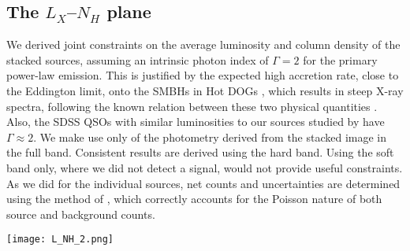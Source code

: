 \documentclass[useAMS,usenatbib]{mnras}
\newcommand*{\chandra}{\textit{Chandra}}
\begin{document}
\subsection{The $L_X$--$N_H$ plane}\label{L_NH_sec}

We derived joint constraints on the average luminosity and column density of the stacked sources, assuming an intrinsic photon index of $\Gamma=2$ for the primary power-law emission. This is justified by the expected high accretion rate, close to the Eddington limit, onto the SMBHs in Hot DOGs \citep{Wu17}, which results in steep X-ray spectra, following the known relation between these two physical quantities \citep[e.g.,][]{Shemmer08,Fanali13,Brightman13,Brightman16}. Also, the SDSS QSOs with similar luminosities to our sources studied by \cite{Just07} have $\Gamma\approx2$. We make use only of the photometry derived from the stacked image in the full band. Consistent results are derived using the hard band. Using the soft band only, where we did not detect a signal, would not provide useful constraints. As we did for the individual sources, net counts and uncertainties are determined using the method of \cite{Weisskopf07}, which correctly accounts for the Poisson nature of both source and background counts.


\begin{figure*} 
	\centering
	\texttt{[image: L\_NH\_2.png]}
	\caption{Locations of the Hot DOGs covered by long-exposure X-ray observations in the $L_X$-$N_H$ plane. Blue symbols are from this work, while black symbols are collected from the literature. See Appendix~\ref{appendix} for the analysis on W2026+0716. We also show the joint constraints on the average intrinsic luminosity and column density derived in \S~\ref{L_NH_sec} for the targets of the  \chandra\, snapshot survey as orange, gold, and red stripes, corresponding to the 68\%, 95\%, and 99\% confidence regions, respectively. The vertical dashed line marks the lower limit (at 95\% confidence level) derived from hardness-ratio analysis of the stacked signal (Fig.~\ref{HR}), assuming an intrinsic $\Gamma=2$. For comparison purposes, we include the luminous Type~1 QSOs with bolometric luminosities similar to Hot DOGs from \citet[green symbols]{Urrutia05}, \citet[grey symbols]{Martocchia17}, and  \citet[purple symbols]{Mountrichas17}. We also show the locations of luminous DOGs from  \citet[cyan symbols]{Corral16} and sub-millimiter galaxies \citep[SMGs;][brown symbols]{Wang13}. Leftward-pointing and downward-pointing triangles are upper limits on $N_H$ and $L_X$, respectively. When possible, error bars and upper limits from the literature have been homogenized to 68\% and 90\% confidence levels, respectively, assuming a Gaussian approximation.
	}
	\label{L_NH}
\end{figure*}
\end{document}
